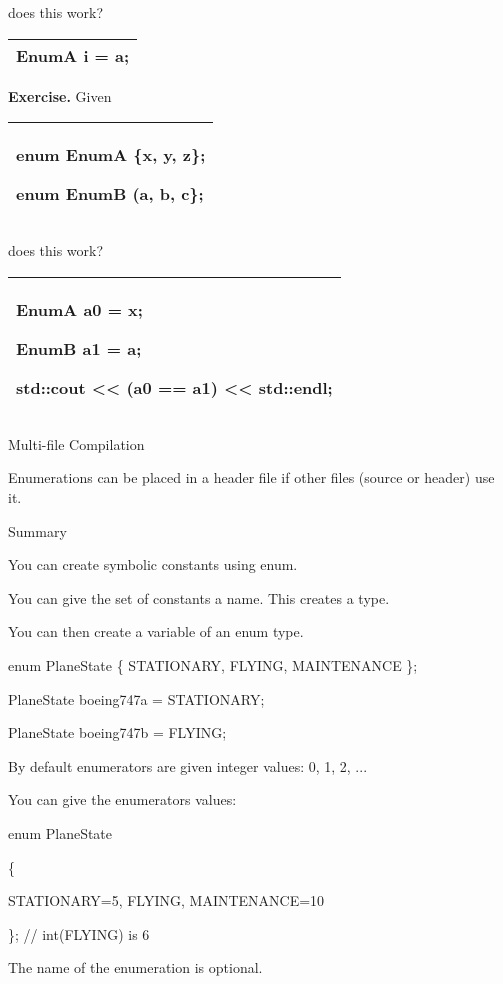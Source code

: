 \documentclass[
]{article}
\begin{document}
does this work?

\begin{longtable}[]{@{}l@{}}
\toprule
\endhead
EnumA i = a;\tabularnewline
\bottomrule
\end{longtable}

\textbf{Exercise.} Given

\begin{longtable}[]{@{}l@{}}
\toprule
\endhead
\begin{minipage}[t]{0.97\columnwidth}\raggedright
enum EnumA \{x, y, z\};

enum EnumB (a, b, c\};\strut
\end{minipage}\tabularnewline
\bottomrule
\end{longtable}

does this work?

\begin{longtable}[]{@{}l@{}}
\toprule
\endhead
\begin{minipage}[t]{0.97\columnwidth}\raggedright
EnumA a0 = x;

EnumB a1 = a;

std::cout \textless\textless{} (a0 == a1) \textless\textless{}
std::endl;\strut
\end{minipage}\tabularnewline
\bottomrule
\end{longtable}

Multi-file Compilation

Enumerations can be placed in a header file if other files (source or
header) use it.

Summary

You can create symbolic constants using enum.

You can give the set of constants a name. This creates a type.

You can then create a variable of an enum type.

enum PlaneState \{ STATIONARY, FLYING, MAINTENANCE \};

PlaneState boeing747a = STATIONARY;

PlaneState boeing747b = FLYING;

By default enumerators are given integer values: 0, 1, 2, ...

You can give the enumerators values:

enum PlaneState

\{

STATIONARY=5, FLYING, MAINTENANCE=10

\}; // int(FLYING) is 6

The name of the enumeration is optional.
\end{document}

